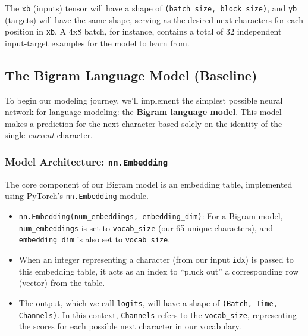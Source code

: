 The \texttt{xb} (inputs) tensor will have a shape of \texttt{(batch\_size, block\_size)}, and \texttt{yb} (targets) will have the same shape, serving as the desired next characters for each position in \texttt{xb}. A 4x8 batch, for instance, contains a total of 32 independent input-target examples for the model to learn from.

\subsection{The Bigram Language Model (Baseline)}

To begin our modeling journey, we'll implement the simplest possible neural network for language modeling: the \textbf{Bigram language model}. This model makes a prediction for the next character based solely on the identity of the single \textit{current} character.

\subsubsection{Model Architecture: \texttt{nn.Embedding}}

The core component of our Bigram model is an embedding table, implemented using PyTorch's \texttt{nn.Embedding} module.
\begin{itemize}
    \item \texttt{nn.Embedding(num\_embeddings, embedding\_dim)}: For a Bigram model, \texttt{num\_embeddings} is set to \texttt{vocab\_size} (our 65 unique characters), and \texttt{embedding\_dim} is also set to \texttt{vocab\_size}.
    \item When an integer representing a character (from our input \texttt{idx}) is passed to this embedding table, it acts as an index to ``pluck out'' a corresponding row (vector) from the table.
    \item The output, which we call \texttt{logits}, will have a shape of \texttt{(Batch, Time, Channels)}. In this context, \texttt{Channels} refers to the \texttt{vocab\_size}, representing the scores for each possible next character in our vocabulary.
\end{itemize}


